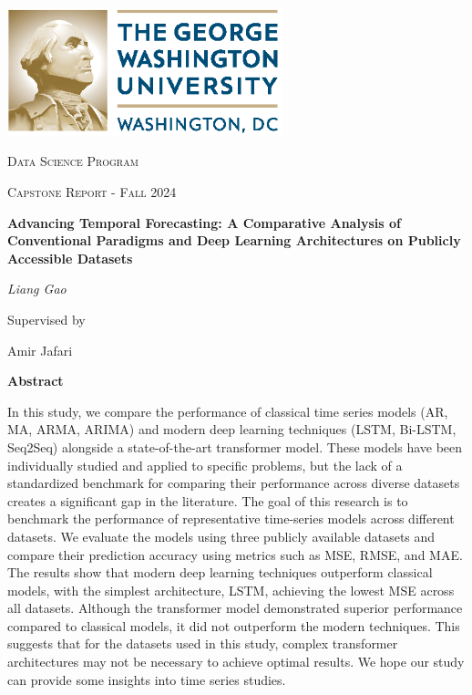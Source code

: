 \documentclass{scrartcl}
\renewenvironment{abstract}{
    \centering
    \textbf{Abstract}
    \vspace{0.5cm}
    \par\itshape
    \begin{minipage}{0.7\linewidth}}{\end{minipage}
    \noindent\ignorespaces
}
\begin{document}
\begin{titlepage}
	\centering
	\includegraphics[width=0.6\textwidth]{GW_logo.eps}\par
	\vspace{2cm}
	{\scshape\LARGE Data Science Program \par}
	\vspace{1cm}
	{\scshape\Large Capstone Report - Fall 2024\par}
	\vspace{1.5cm}
	{\huge\bfseries Advancing Temporal Forecasting: A Comparative Analysis of Conventional Paradigms and Deep Learning Architectures on Publicly Accessible Datasets \par}
	\vspace{2cm}
	{\Large\itshape Liang Gao}\par
	\vspace{1.5cm}
	Supervised by\par
	Amir Jafari


        \newpage

	\begin{abstract}
            In this study, we compare the performance of classical time series models (AR, MA, ARMA, ARIMA) and modern deep learning techniques (LSTM, Bi-LSTM, Seq2Seq) alongside a state-of-the-art transformer model. These models have been individually studied and applied to specific problems, but the lack of a standardized benchmark for comparing their performance across diverse datasets creates a significant gap in the literature. The goal of this research is to benchmark the performance of representative time-series models across different datasets. We evaluate the models using three publicly available datasets and compare their prediction accuracy using metrics such as MSE, RMSE, and MAE. The results show that modern deep learning techniques outperform classical models, with the simplest architecture, LSTM, achieving the lowest MSE across all datasets. Although the transformer model demonstrated superior performance compared to classical models, it did not outperform the modern techniques. This suggests that for the datasets used in this study, complex transformer architectures may not be necessary to achieve optimal results. We hope our study can provide some insights into time series studies. 
	\end{abstract}
	\vfill
\end{titlepage}
\tableofcontents
\newpage
\end{document}
